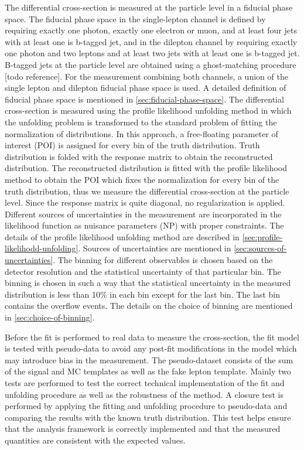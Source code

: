 The differential cross-section is measured at the particle level in a fiducial phase space. The fiducial phase space in the single-lepton channel is defined by requiring exactly one photon, exactly one electron or muon, and at least four jets with at least one is b-tagged jet, and in the dilepton channel by requiring exactly one photon and two leptons and at least two jets with at least one is b-tagged jet. B-tagged jets at the particle level are obtained using a ghost-matching procedure [todo reference]. For the measurement combining both channels, a union of the single lepton and dilepton fiducial phase space is used. A detailed definition of fiducial phase space is mentioned in \cref{sec:fiducial-phase-space}. The differential cross-section is measured using the profile likelihood unfolding method in which the unfolding problem is transformed to the standard problem of fitting the normalization of distributions. In this approach, a free-floating parameter of interest (POI) is assigned for every bin of the truth distribution. Truth distribution is folded with the response matrix to obtain the reconstructed distribution. The reconstructed distribution is fitted with the profile likelihood method to obtain the POI which fixes the normalization for every bin of the truth distribution, thus we measure the differential cross-section at the particle level. Since the response matrix is quite diagonal, no regularization is applied. Different sources of uncertainties in the measurement are incorporated in the likelihood function as nuisance parameters (NP) with proper constraints. The details of the profile likelihood unfolding method are described in \cref{sec:profile-likelihodd-unfolding}. Sources of uncertainties are mentioned in \cref{sec:sources-of-uncertainties}. The binning for different observables is chosen based on the detector resolution and the statistical uncertainty of that particular bin. The binning is chosen in such a way that the statistical uncertainty in the measured distribution is less than 10\% in each bin except for the last bin. The last bin contains the overflow events. The details on the choice of binning are mentioned in \cref{sec:choice-of-binning}.

Before the fit is performed to real data to measure the cross-section, the fit model is tested with pseudo-data to avoid any post-fit modifications in the model which may introduce bias in the measurement. The pseudo-dataset consists of the sum of the signal and MC templates as well as the fake lepton template. Mainly two tests are performed to test the correct technical implementation of the fit and unfolding procedure as well as the robustness of the method. A closure test is performed by applying the fitting and unfolding procedure to pseudo-data and comparing the results with the known truth distribution. This test helps ensure that the analysis framework is correctly implemented and that the measured quantities are consistent with the expected values.

